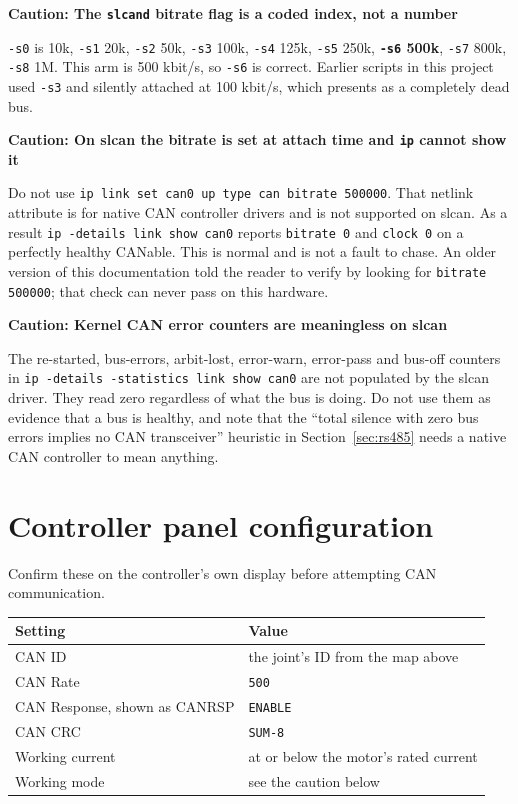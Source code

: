 \documentclass[11pt,letterpaper]{article}
\newenvironment{caution}[1]{%
    \par\addvspace{8pt}%
    \noindent{\color{cautionred}\rule{\linewidth}{0.8pt}}\par\vspace{2pt}
    \noindent\textbf{\color{cautionred}Caution: #1}\par\vspace{2pt}
}{%
    \par\vspace{2pt}\noindent{\color{cautionred}\rule{\linewidth}{0.4pt}}%
    \par\addvspace{8pt}%
}
\begin{document}
\begin{caution}{The \texttt{slcand} bitrate flag is a coded index, not a number}
\texttt{-s0} is 10k, \texttt{-s1} 20k, \texttt{-s2} 50k, \texttt{-s3} 100k,
\texttt{-s4} 125k, \texttt{-s5} 250k, \textbf{\texttt{-s6} 500k}, \texttt{-s7} 800k,
\texttt{-s8} 1M. This arm is 500 kbit/s, so \texttt{-s6} is correct. Earlier scripts
in this project used \texttt{-s3} and silently attached at 100 kbit/s, which
presents as a completely dead bus.
\end{caution}

\begin{caution}{On slcan the bitrate is set at attach time and \texttt{ip} cannot show it}
Do not use \texttt{ip link set can0 up type can bitrate 500000}. That netlink
attribute is for native CAN controller drivers and is not supported on slcan. As a
result \texttt{ip -details link show can0} reports \texttt{bitrate 0} and
\texttt{clock 0} on a perfectly healthy CANable. This is normal and is not a fault
to chase. An older version of this documentation told the reader to verify by
looking for \texttt{bitrate 500000}; that check can never pass on this hardware.
\end{caution}

\begin{caution}{Kernel CAN error counters are meaningless on slcan}
The re-started, bus-errors, arbit-lost, error-warn, error-pass and bus-off counters
in \texttt{ip -details -statistics link show can0} are not populated by the slcan
driver. They read zero regardless of what the bus is doing. Do not use them as
evidence that a bus is healthy, and note that the ``total silence with zero bus
errors implies no CAN transceiver'' heuristic in Section~\ref{sec:rs485} needs a
native CAN controller to mean anything.
\end{caution}

\section{Controller panel configuration}
\label{sec:panel}

Confirm these on the controller's own display before attempting CAN communication.

\begin{center}
\begin{tabular}{ll}
\toprule
\textbf{Setting} & \textbf{Value} \\ \midrule
CAN ID   & the joint's ID from the map above \\
CAN Rate & \texttt{500} \\
CAN Response, shown as CANRSP & \texttt{ENABLE} \\
CAN CRC  & \texttt{SUM-8} \\
Working current & at or below the motor's rated current \\
Working mode & see the caution below \\
\bottomrule
\end{tabular}
\end{center}
\end{document}
